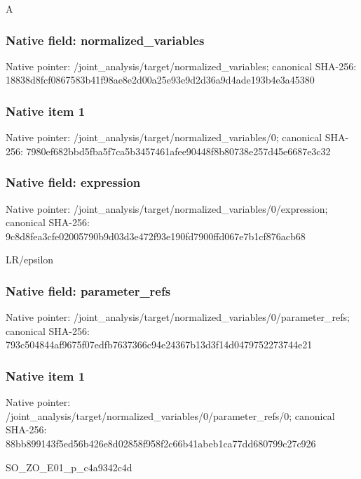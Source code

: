 \documentclass[10pt,a4paper]{article}
\begin{document}
\begingroup\raggedright\sloppy A\par\endgroup

\subsubsection{Native field: normalized\_\allowbreak{}variables}
Native pointer: /joint\_\allowbreak{}analysis/target/normalized\_\allowbreak{}variables; canonical SHA-256: 18838d8fcf0867583b41f98ae8e2d00a25e93e9d2d36a9d4ade193b4e3a45380

\subsubsection{Native item 1}
Native pointer: /joint\_\allowbreak{}analysis/target/normalized\_\allowbreak{}variables/0; canonical SHA-256: 7980ef682bbd5fba5f7ca5b3457461afee90448f8b80738e257d45e6687e3c32

\subsubsection{Native field: expression}
Native pointer: /joint\_\allowbreak{}analysis/target/normalized\_\allowbreak{}variables/0/expression; canonical SHA-256: 9c8d8fea3cfe02005790b9d03d3e472f93e190fd7900ffd067e7b1cf876acb68

\begingroup\raggedright\sloppy LR/\allowbreak{}epsilon\par\endgroup

\subsubsection{Native field: parameter\_\allowbreak{}refs}
Native pointer: /joint\_\allowbreak{}analysis/target/normalized\_\allowbreak{}variables/0/parameter\_\allowbreak{}refs; canonical SHA-256: 793c504844af9675f07edfb7637366c94e24367b13d3f14d0479752273744e21

\subsubsection{Native item 1}
Native pointer: /joint\_\allowbreak{}analysis/target/normalized\_\allowbreak{}variables/0/parameter\_\allowbreak{}refs/0; canonical SHA-256: 88bb899143f5ed56b426e8d02858f958f2c66b41abeb1ca77dd680799c27c926

\begingroup\raggedright\sloppy SO\_\allowbreak{}ZO\_\allowbreak{}E01\_\allowbreak{}p\_\allowbreak{}c4a9342c4d\par\endgroup
\end{document}

